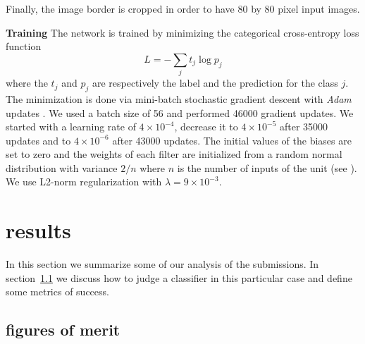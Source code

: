 \documentclass[useAMS,usenatbib]{mnras}
\begin{document}
Finally, the image border is cropped in order to have 80 by 80 pixel input images.

{\bf Training}
The network is trained by minimizing the categorical cross-entropy loss function
\begin{equation}
L = -\sum_j t_{j}\log p_{j}
\label{EQloss}
\end{equation}
where the $t_j$ and $p_j$ are respectively the label and the prediction for the class $j$. 
The minimization is done via mini-batch stochastic gradient descent with \textit{Adam} updates \citep{Kingma_2014}. We used a batch size of 56 and performed  46000 gradient updates. We started with a learning rate of $4 \times 10^{-4}$, decrease it to $4 \times 10^{-5}$ after 35000 updates and to $4 \times 10^{-6}$ after 43000 updates.
The initial values of the biases are set to zero and the weights of each filter are initialized from a random normal distribution with variance ${2/n}$ where $n$ is the number of inputs of the unit (see \citep{he2015delving}).  
We use L2-norm regularization with $\lambda= 9 \times 10^{-3}$.

\section{results}
\label{sec:results}

In this section we summarize some of our analysis of the submissions.  In section~\ref{sec:figure_of_merit} we discuss how to judge a classifier in this particular case and define some metrics of success.

\subsection{figures of merit}
\label{sec:figure_of_merit}
\end{document}
